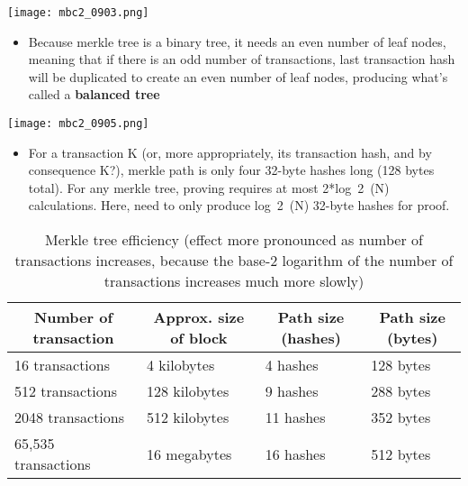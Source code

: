 \documentclass[english, 11pt]{article}
\begin{document}
\begin{tcolorbox}
\begin{minipage}{0.45\linewidth}
    \texttt{[image: mbc2\_0903.png]}
    \label{fig:fig2}  
\end{minipage}\hfil
\begin{minipage}{0.45\linewidth}
\begin{itemize}
    \item Because merkle tree is a binary tree, it needs an even number of leaf nodes, meaning that if there is an odd number of transactions, last transaction hash will be duplicated to create an even number of leaf nodes, producing what's called a \textbf{balanced tree}
\end{itemize}
\end{minipage}
\end{tcolorbox}

\begin{tcolorbox}
\begin{minipage}{0.45\linewidth}
    \texttt{[image: mbc2\_0905.png]}
    \label{fig:fig2}  
\end{minipage}\hfil
\begin{minipage}{0.45\linewidth}
\begin{itemize}
    \item For a transaction K (or, more appropriately, its transaction hash, and by consequence K?), merkle path is only four 32-byte hashes long (128 bytes total). For any merkle tree, proving requires at most 2*log~2~(N) calculations. Here, need to only produce log~2~(N) 32-byte hashes for proof.
\end{itemize}
\end{minipage}
\end{tcolorbox}

\begin{table}[H]
\centering
\caption{Merkle tree efficiency (effect more pronounced as number of transactions increases, because the base-2 logarithm of the number of transactions increases much more slowly)}
\label{my-label}
\begin{tabular}{|l|l|l|l|}
\hline
\multicolumn{1}{|c|}{\textbf{Number of transaction}} & \multicolumn{1}{c|}{\textbf{Approx. size of block}} & \multicolumn{1}{c|}{\textbf{Path size (hashes)}} & \multicolumn{1}{c|}{\textbf{Path size (bytes)}} \\ \hline
16 transactions & 4 kilobytes & 4 hashes & 128 bytes \\ \hline
512 transactions & 128 kilobytes & 9 hashes & 288 bytes \\ \hline
2048 transactions & 512 kilobytes & 11 hashes & 352 bytes \\ \hline
65,535 transactions & 16 megabytes & 16 hashes & 512 bytes \\ \hline
\end{tabular}
\end{table}
\end{document}
